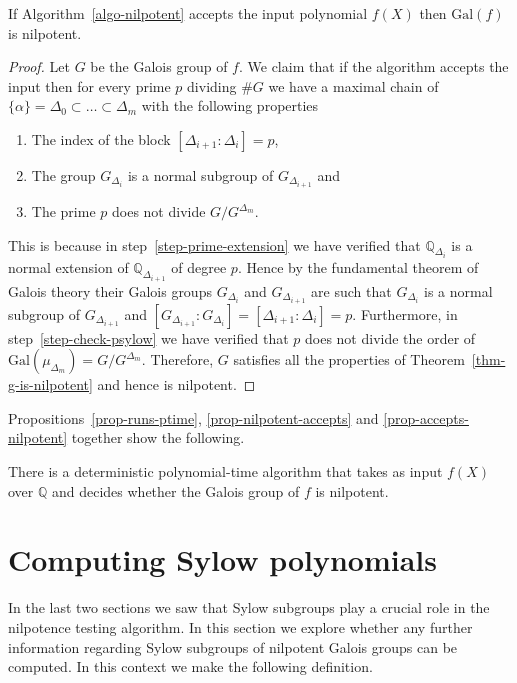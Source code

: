 \documentclass[prodmod,acmtalg]{acmsmall}
\newcommand{\size}[1]{{\ensuremath{\mathrm{size}\left(#1\right)}}}
\newcommand{\Gal}[1]{{\ensuremath{\mathrm{Gal}\left(#1\right)}}}
\newcommand{\Q}{\ensuremath{\mathbb{Q}}}
\begin{document}
\begin{proposition}\label{prop-accepts-nilpotent}
  If Algorithm~\ref{algo-nilpotent} accepts the input polynomial
  $f(X)$ then $\Gal{f}$ is nilpotent.
\end{proposition}
\begin{proof}
  Let $G$ be the Galois group of $f$. We claim that if the algorithm
  accepts the input then for every prime $p$ dividing $\# G$ we have a
  maximal chain of $\{\alpha\} = \Delta_0 \subset \ldots \subset
  \Delta_m$ with the following properties
  \begin{enumerate}
  \item The index of the block $[\Delta_{i+1}: \Delta_i] = p$,
  \item The group $G_{\Delta_i}$ is a normal subgroup of
    $G_{\Delta_{i+1}}$ and
  \item The prime $p$ does not divide $G/G^{\Delta_m}$.
  \end{enumerate}

  This is because in step~\ref{step-prime-extension} we have verified
  that $\Q_{\Delta_i}$ is a normal extension of $\Q_{\Delta_{i+1}}$ of
  degree $p$. Hence by the fundamental theorem of Galois theory their
  Galois groups $G_{\Delta_i}$ and $G_{\Delta_{i+1}}$ are such that
  $G_{\Delta_i}$ is a normal subgroup of $G_{\Delta_{i+1}}$ and
  $[G_{\Delta_{i+1}}:G_{\Delta_i}] = [\Delta_{i+1}: \Delta_i] =
  p$. Furthermore, in step~\ref{step-check-psylow} we have verified
  that $p$ does not divide the order of $\Gal{\mu_{\Delta_m}} =
  G/G^{\Delta_m}$. Therefore, $G$ satisfies all the properties of
  Theorem~\ref{thm-g-is-nilpotent} and hence is nilpotent.
\end{proof}

Propositions~\ref{prop-runs-ptime}, \ref{prop-nilpotent-accepts} and
\ref{prop-accepts-nilpotent} together show the following.

\begin{theorem}\label{thm-main}
  There is a deterministic polynomial-time algorithm that takes as
  input $f(X)$ over $\Q$ and decides whether the Galois group of $f$
  is nilpotent.
\end{theorem}

\section{Computing Sylow polynomials}

In the last two sections we saw that Sylow subgroups play a crucial
role in the nilpotence testing algorithm. In this section we explore
whether any further information regarding Sylow subgroups of nilpotent
Galois groups can be computed. In this context we make the following
definition.
\end{document}
